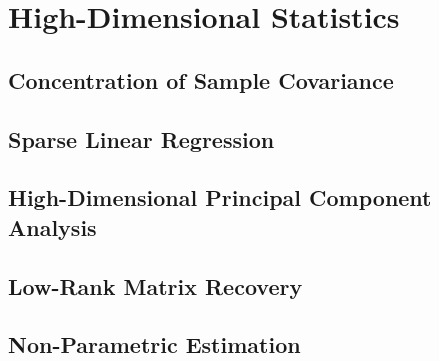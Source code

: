 \newpage
\section{High-Dimensional Statistics}

\subsection{Concentration of Sample Covariance}

\subsection{Sparse Linear Regression}

\subsection{High-Dimensional Principal Component Analysis}

\subsection{Low-Rank Matrix Recovery}

\subsection{Non-Parametric Estimation}